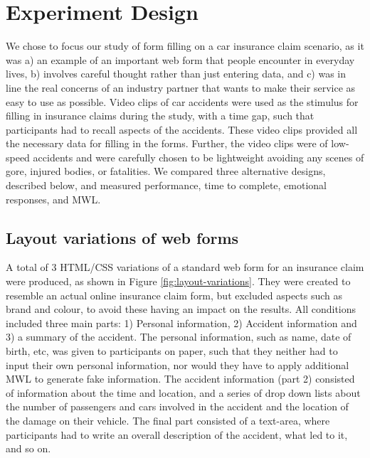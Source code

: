 \documentclass[../main/Feedback.tex]{subfiles}
\begin{document}
\section{Experiment Design}
We chose to focus our study of form filling on a car insurance claim scenario, as it was a) an example of an important web form that people encounter in everyday lives, b) involves careful thought rather than just entering data, and c) was in line the real concerns of an industry partner that wants to make their service as easy to use as possible. Video clips of car accidents were used as the stimulus for filling in insurance claims during the study, with a time gap, such that participants had to recall aspects of the accidents. These video clips provided all the necessary data for filling in the forms.
Further, the video clips were of low-speed accidents and were carefully chosen to be lightweight avoiding any scenes of gore, injured bodies, or fatalities. We compared three alternative designs, described below, and measured performance, time to complete, emotional responses, and MWL.

\subsection{Layout variations of web forms}
A total of 3 HTML/CSS variations of a standard web form for an insurance claim were produced, as shown in Figure \ref{fig:layout-variations}.
They were created to resemble an actual online insurance claim form, but excluded aspects such as brand and colour, to avoid these having an impact on the results.
All conditions included three main parts: 1) Personal information, 2) Accident information and 3) a summary of the accident.
The personal information, such as name, date of birth, etc, was given to participants on paper, such that they neither had to input their own personal information, nor would they have to apply additional MWL to generate fake information.
The accident information (part 2) consisted of information about the time and location, and a series of drop down lists about the number of passengers and cars involved in the accident and the location of the damage on their vehicle.
The final part consisted of a text-area, where participants had to write an overall description of the accident, what led to it, and so on.
\end{document}
